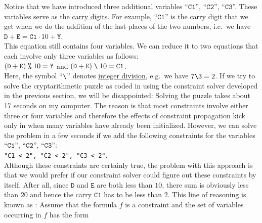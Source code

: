 Notice that we have introduced three additional variables ``$\texttt{C1}$'', ``$\texttt{C2}$'', ``$\texttt{C3}$''. 
These variables serve as the \href{https://en.wikipedia.org/wiki/Carry_(arithmetic)}{carry digits}.  For
example, ``$\texttt{C1}$'' is the carry digit that we get when we do the addition of the last places of the two
numbers, i.e.~we have
\\[0.2cm]
\hspace*{1.3cm}
$\texttt{D} + \texttt{E} = \texttt{C1} \cdot 10 + \texttt{Y}$.
\\[0.2cm]
This equation still contains four variables.  We can reduce it to two equations that each involve only three
variables as follows:
\\[0.2cm]
\hspace*{1.3cm}
$(\texttt{D} + \texttt{E})\; \texttt{\symbol{37}}\; 10 = \texttt{Y}$ \quad and \quad
$(\texttt{D} + \texttt{E}) \;\texttt{\symbol{92}}\; 10 = \texttt{C1}$.
\\[0.2cm]
Here, the symbol ``$\texttt{\symbol{92}}$'' denotes 
\href{https://en.wikipedia.org/wiki/Division_(mathematics)#Of_integers}{integer division}, e.g.~we have $7 \texttt{\symbol{92}} 3 = 2$.
If we try to solve the cryptarithmetic puzzle as coded in  using the
constraint solver developed in the previous section, we will be disappointed: Solving the puzzle takes about 17
seconds on my computer.  The reason is that most constraints involve either three or four variables and
therefore the effects of constraint propagation kick only in when many variables have already been initialized.
However, we can solve the problem in a few seconds if we add the following constraints for the 
variables ``$\texttt{C1}$'', ``$\texttt{C2}$'', ``$\texttt{C3}$'':
\\[0.2cm]
\hspace*{1.3cm}
\texttt{"C1 < 2", "C2 < 2", "C3 < 2"}.
\\[0.2cm]
Although these constraints are certainly true, the problem with this approach is that we would prefer if our
constraint solver could figure out these constraints by itself.  After all, since $\texttt{D}$ and
$\texttt{E}$ are both less than $10$, there sum is obviously less than $20$ and hence the carry $\texttt{C1}$
has to be less than $2$.  This line of reasoning is known as :
Assume that the formula $f$ is a constraint and the set of variables occurring in $f$ has the form
\\[0.2cm]
\hspace*{1.3cm}
